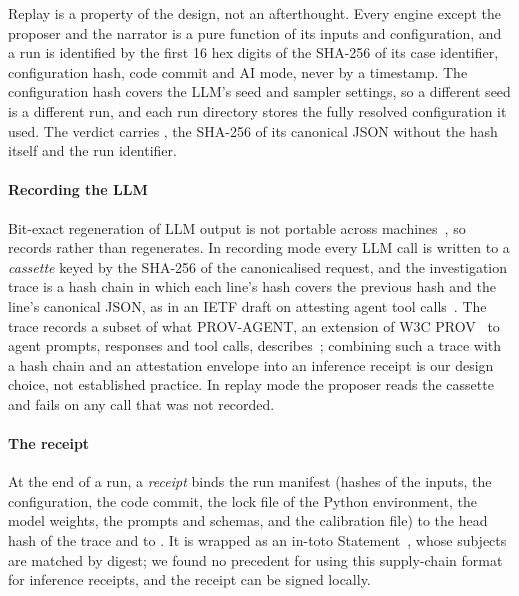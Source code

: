 Replay is a property of the design, not an afterthought.
Every engine except the proposer and the narrator is a pure function of its inputs and configuration, and a run is identified by the first 16 hex digits of the SHA-256 of its case identifier, configuration hash, code commit and AI mode, never by a timestamp.
The configuration hash covers the LLM's seed and sampler settings, so a different seed is a different run, and each run directory stores the fully resolved configuration it used.
The verdict carries , the SHA-256 of its canonical JSON without the hash itself and the run identifier.

\paragraph{Recording the LLM}
Bit-exact regeneration of LLM output is not portable across machines~\cite{thinkingmachinesnondeterminism}, so \sys records rather than regenerates.
In recording mode every LLM call is written to a \emph{cassette} keyed by the SHA-256 of the canonicalised request, and the investigation trace is a hash chain in which each line's hash covers the previous hash and the line's canonical JSON, as in an IETF draft on attesting agent tool calls~\cite{ietfwca2026}.
The trace records a subset of what PROV-AGENT, an extension of W3C PROV~\cite{w3cprov2013} to agent prompts, responses and tool calls, describes~\cite{provagent2025}; combining such a trace with a hash chain and an attestation envelope into an inference receipt is our design choice, not established practice.
In replay mode the proposer reads the cassette and fails on any call that was not recorded.

\paragraph{The receipt}
At the end of a run, a \emph{receipt} binds the run manifest (hashes of the inputs, the configuration, the code commit, the lock file of the Python environment, the model weights, the prompts and schemas, and the calibration file) to the head hash of the trace and to .
It is wrapped as an in-toto Statement~\cite{intoto}, whose subjects are matched by digest; we found no precedent for using this supply-chain format for inference receipts, and the receipt can be signed locally.

